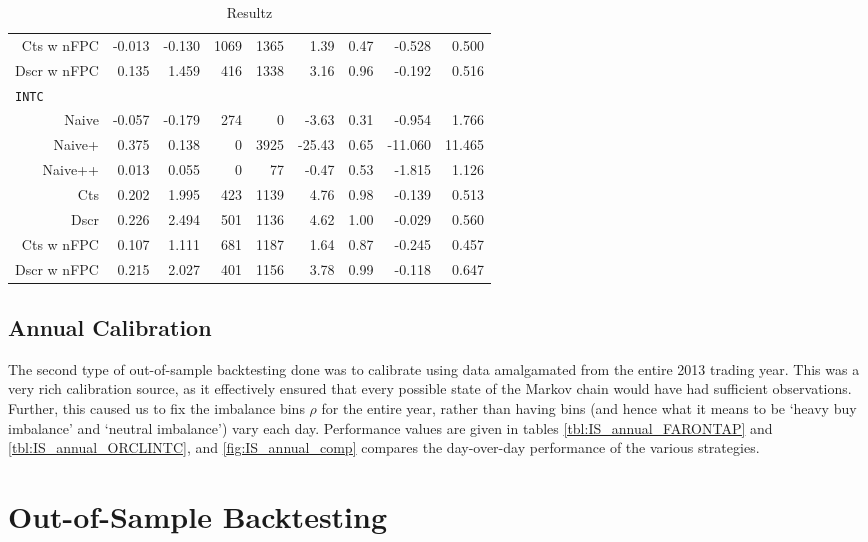 \begin{table}
\begin{tabular}{@{} *{9}{r} @{}}
Cts w nFPC & -0.013 & -0.130 & 1069 & 1365 & 1.39 & 0.47 & -0.528 & 0.500 \\ 
Dscr w nFPC & 0.135 & 1.459 & 416 & 1338 & 3.16 & 0.96 & -0.192 & 0.516 \\[2ex]
\multicolumn{9}{l}{\texttt{INTC}} \\ 
Naive & -0.057 & -0.179 & 274 & 0 & -3.63 & 0.31 & -0.954 & 1.766 \\ 
Naive+ & 0.375 & 0.138 & 0 & 3925 & -25.43 & 0.65 & -11.060 & 11.465 \\ 
Naive++ & 0.013 & 0.055 & 0 & 77 & -0.47 & 0.53 & -1.815 & 1.126 \\ 
Cts & 0.202 & 1.995 & 423 & 1139 & 4.76 & 0.98 & -0.139 & 0.513 \\ 
Dscr & 0.226 & 2.494 & 501 & 1136 & 4.62 & 1.00 & -0.029 & 0.560 \\ 
Cts w nFPC & 0.107 & 1.111 & 681 & 1187 & 1.64 & 0.87 & -0.245 & 0.457 \\ 
Dscr w nFPC & 0.215 & 2.027 & 401 & 1156 & 3.78 & 0.99 & -0.118 & 0.647 \\ 
\bottomrule
\end{tabular}
\caption{Resultz}
\label{tbl:IS_week}
\end{table}

\FloatBarrier
\subsection{Annual Calibration}
The second type of out-of-sample backtesting done was to calibrate using data amalgamated from the entire 2013 trading year. This was a very rich calibration source, as it effectively ensured that every possible state of the Markov chain would have had sufficient observations. Further, this caused us to fix the imbalance bins $\rho$ for the entire year, rather than having bins (and hence what it means to be `heavy buy imbalance' and `neutral imbalance') vary each day. Performance values are given in tables \autoref{tbl:IS_annual_FARONTAP} and \autoref{tbl:IS_annual_ORCLINTC}, and \autoref{fig:IS_annual_comp} compares the day-over-day performance of the various strategies. 


\FloatBarrier
\section{Out-of-Sample Backtesting}